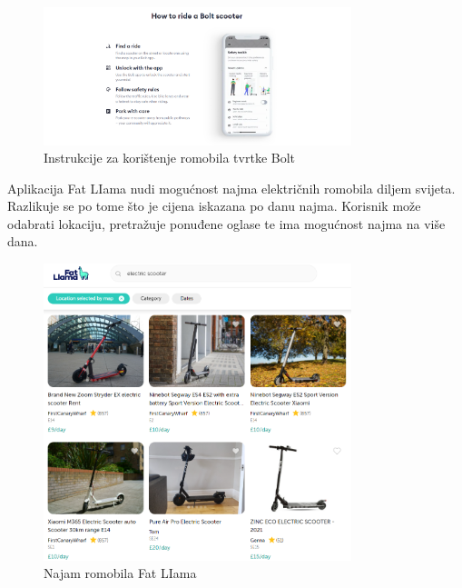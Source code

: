 		\begin{figure}[t]
			\centering
			\includegraphics[width=0.8\textwidth]{slike/bolt-2.png}
			\caption{Instrukcije za korištenje romobila tvrtke Bolt}
			\label{fig:bolt-2}
		\end{figure}
		
		\indent Aplikacija Fat LIama nudi mogućnost najma električnih romobila diljem svijeta. Razlikuje se po tome što je cijena iskazana po danu najma. Korisnik može odabrati lokaciju, pretražuje ponuđene oglase te ima mogućnost najma na više dana.\\
		
		\begin{figure}[t]
			\centering
			\includegraphics[width=0.8\textwidth]{slike/fat-liam.png}
			\caption{Najam romobila Fat LIama}
			\label{fig:fat-liama}
		\end{figure}
		
		
		
		
		
		
	